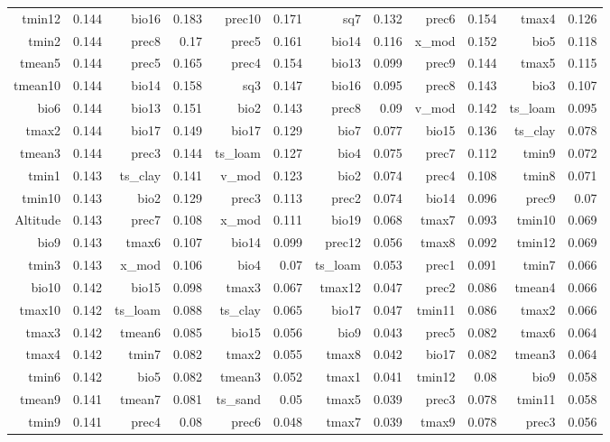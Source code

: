 \documentclass[11pt]{article}
\begin{document}
\begin{linenumbers}
\begin{flushleft}
\begin{table}[htbp]
\begin{tabular}{rrrrrrrrrrrr}
    tmin12 & 0.144 & bio16 & 0.183 & prec10 & 0.171 & sq7   & 0.132 & prec6 & 0.154 & tmax4 & 0.126 \\
    tmin2 & 0.144 & prec8 & 0.17  & prec5 & 0.161 & bio14 & 0.116 & x\_mod & 0.152 & bio5  & 0.118 \\
    tmean5 & 0.144 & prec5 & 0.165 & prec4 & 0.154 & bio13 & 0.099 & prec9 & 0.144 & tmax5 & 0.115 \\
    tmean10 & 0.144 & bio14 & 0.158 & sq3   & 0.147 & bio16 & 0.095 & prec8 & 0.143 & bio3  & 0.107 \\
    bio6  & 0.144 & bio13 & 0.151 & bio2  & 0.143 & prec8 & 0.09  & v\_mod & 0.142 & ts\_loam & 0.095 \\
    tmax2 & 0.144 & bio17 & 0.149 & bio17 & 0.129 & bio7  & 0.077 & bio15 & 0.136 & ts\_clay & 0.078 \\
    tmean3 & 0.144 & prec3 & 0.144 & ts\_loam & 0.127 & bio4  & 0.075 & prec7 & 0.112 & tmin9 & 0.072 \\
    tmin1 & 0.143 & ts\_clay & 0.141 & v\_mod & 0.123 & bio2  & 0.074 & prec4 & 0.108 & tmin8 & 0.071 \\
    tmin10 & 0.143 & bio2  & 0.129 & prec3 & 0.113 & prec2 & 0.074 & bio14 & 0.096 & prec9 & 0.07 \\
    Altitude & 0.143 & prec7 & 0.108 & x\_mod & 0.111 & bio19 & 0.068 & tmax7 & 0.093 & tmin10 & 0.069 \\
    bio9  & 0.143 & tmax6 & 0.107 & bio14 & 0.099 & prec12 & 0.056 & tmax8 & 0.092 & tmin12 & 0.069 \\
    tmin3 & 0.143 & x\_mod & 0.106 & bio4  & 0.07  & ts\_loam & 0.053 & prec1 & 0.091 & tmin7 & 0.066 \\
    bio10 & 0.142 & bio15 & 0.098 & tmax3 & 0.067 & tmax12 & 0.047 & prec2 & 0.086 & tmean4 & 0.066 \\
    tmax10 & 0.142 & ts\_loam & 0.088 & ts\_clay & 0.065 & bio17 & 0.047 & tmin11 & 0.086 & tmax2 & 0.066 \\
    tmax3 & 0.142 & tmean6 & 0.085 & bio15 & 0.056 & bio9  & 0.043 & prec5 & 0.082 & tmax6 & 0.064 \\
    tmax4 & 0.142 & tmin7 & 0.082 & tmax2 & 0.055 & tmax8 & 0.042 & bio17 & 0.082 & tmean3 & 0.064 \\
    tmin6 & 0.142 & bio5  & 0.082 & tmean3 & 0.052 & tmax1 & 0.041 & tmin12 & 0.08  & bio9  & 0.058 \\
    tmean9 & 0.141 & tmean7 & 0.081 & ts\_sand & 0.05  & tmax5 & 0.039 & prec3 & 0.078 & tmin11 & 0.058 \\
    tmin9 & 0.141 & prec4 & 0.08  & prec6 & 0.048 & tmax7 & 0.039 & tmax9 & 0.078 & prec3 & 0.056 \\

\end{tabular}
\end{table}
\end{flushleft}
\end{linenumbers}
\end{document}
